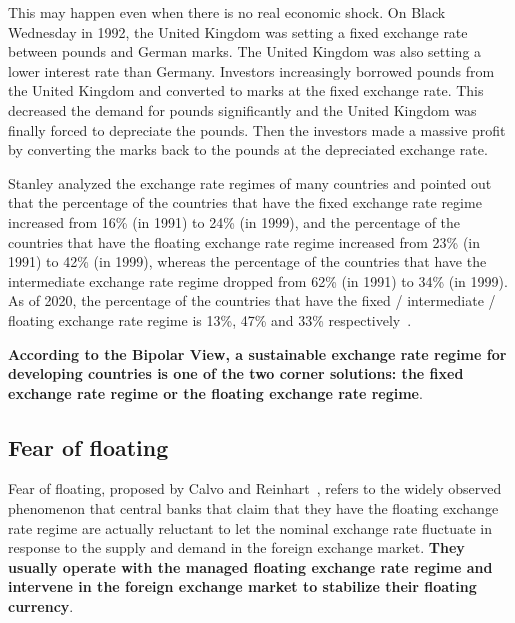 \documentclass[dvipdfmx,a4paper]{article}
\begin{document}
This may happen even when there is no real economic shock. On Black Wednesday in 1992, the United Kingdom was setting a fixed exchange rate between pounds and German marks. The United Kingdom was also setting a lower interest rate than Germany. Investors increasingly borrowed pounds from the United Kingdom and converted to marks at the fixed exchange rate. This decreased the demand for pounds significantly and the United Kingdom was finally forced to depreciate the pounds. Then the investors made a massive profit by converting the marks back to the pounds at the depreciated exchange rate.

Stanley analyzed the exchange rate regimes of many countries and pointed out that the percentage of the countries that have the fixed exchange rate regime increased from 16\% (in 1991) to 24\% (in 1999), and the percentage of the countries that have the floating exchange rate regime increased from 23\% (in 1991) to 42\% (in 1999), whereas the percentage of the countries that have the intermediate exchange rate regime dropped from 62\% (in 1991) to 34\% (in 1999). As of 2020, the percentage of the countries that have the fixed / intermediate / floating exchange rate regime is 13\%, 47\% and 33\% respectively~\cite{imfreport}.

\textbf{According to the Bipolar View, a sustainable exchange rate regime for developing countries is one of the two corner solutions: the fixed exchange rate regime or the floating exchange rate regime}.

\subsection{Fear of floating}

Fear of floating, proposed by Calvo and Reinhart~\cite{calvo2002fear}, refers to the widely observed phenomenon that central banks that claim that they have the floating exchange rate regime are actually reluctant to let the nominal exchange rate fluctuate in response to the supply and demand in the foreign exchange market. \textbf{They usually operate with the managed floating exchange rate regime and intervene in the foreign exchange market to stabilize their floating currency}.
\end{document}
